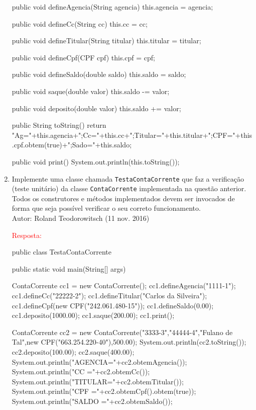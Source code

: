 \documentclass[onecolumn,a4paper,10pt]{report}
\newcommand{\+}{\, + \,}
\newcommand{\<}{\hspace*{-0.4cm}}
\begin{document}
\begin{enumerate}
{\begin{javacode}
{    public void defineAgencia(String agencia) {
        this.agencia = agencia;
    }
    
    public void defineCc(String cc) {
        this.cc = cc;
    }
    
    public void defineTitular(String titular) {
        this.titular = titular;
    }
    
    public void defineCpf(CPF cpf) {
        this.cpf = cpf;
    }
    
    public void defineSaldo(double saldo) {
        this.saldo = saldo;
    }
    
    public void saque(double valor) {
        this.saldo -= valor;
    }
    
    public void deposito(double valor) {
        this.saldo += valor;
    }
    
    public String toString() {
        return "Ag="+this.agencia+";Cc="+this.cc+";Titular="+this.titular+";CPF="+this.cpf.obtem(true)+";Sado="+this.saldo;
    }
    
    public void print() {
        System.out.println(this.toString());
    }
    
}
\end{javacode}
}
\newpage

\item Implemente uma classe chamada \texttt{TestaContaCorrente} que faz a verificação (teste unitário) da classe \texttt{ContaCorrente} implementada na questão anterior. Todos os construtores e métodos implementados devem ser invocados de forma que seja possível verificar o seu correto funcionamento.\\
{\tiny Autor: Roland Teodorowitsch (11 nov. 2016)}\\
{\tiny \textcolor{red}{Resposta:}\\
\begin{javacode}
public class TestaContaCorrente {
    public static void main(String[] args) {
        ContaCorrente cc1 = new ContaCorrente();
        cc1.defineAgencia("1111-1");
        cc1.defineCc("22222-2");
        cc1.defineTitular("Carlos da Silveira");
        cc1.defineCpf(new CPF("242.061.480-15"));
        cc1.defineSaldo(0.00);
        cc1.deposito(1000.00);
        cc1.saque(200.00);
        cc1.print();
        
        ContaCorrente cc2 = new ContaCorrente("3333-3","44444-4","Fulano de Tal",new CPF("663.254.220-40"),500.00);
        System.out.println(cc2.toString());
        cc2.deposito(100.00);
        cc2.saque(400.00);
        System.out.println("AGENCIA="+cc2.obtemAgencia());
        System.out.println("CC     ="+cc2.obtemCc());
        System.out.println("TITULAR="+cc2.obtemTitular());
        System.out.println("CPF    ="+cc2.obtemCpf().obtem(true));
        System.out.println("SALDO  ="+cc2.obtemSaldo());        
    }
}
\end{javacode}
}
\newpage


\end{enumerate}
\end{document}
